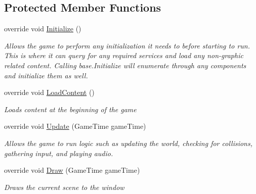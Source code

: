 \subsection*{Protected Member Functions}
\begin{DoxyCompactItemize}
\item 
override void \hyperlink{class_midnight_blue_1_1_engine_1_1_m_b_game_a0e02fa538b3344104374f61a058516f8}{Initialize} ()
\begin{DoxyCompactList}\small\item\em Allows the game to perform any initialization it needs to before starting to run. This is where it can query for any required services and load any non-\/graphic related content. Calling base.\+Initialize will enumerate through any components and initialize them as well. \end{DoxyCompactList}\item 
override void \hyperlink{class_midnight_blue_1_1_engine_1_1_m_b_game_ad37b75158d6181720f57cad9cb78df56}{Load\+Content} ()
\begin{DoxyCompactList}\small\item\em Loads content at the beginning of the game \end{DoxyCompactList}\item 
override void \hyperlink{class_midnight_blue_1_1_engine_1_1_m_b_game_a10a451d83e4163e9bb1c9bcdc6719db3}{Update} (Game\+Time game\+Time)
\begin{DoxyCompactList}\small\item\em Allows the game to run logic such as updating the world, checking for collisions, gathering input, and playing audio. \end{DoxyCompactList}\item 
override void \hyperlink{class_midnight_blue_1_1_engine_1_1_m_b_game_a28dd0bac108b77fe04164ff81acf9881}{Draw} (Game\+Time game\+Time)
\begin{DoxyCompactList}\small\item\em Draws the current scene to the window \end{DoxyCompactList}\end{DoxyCompactItemize}
